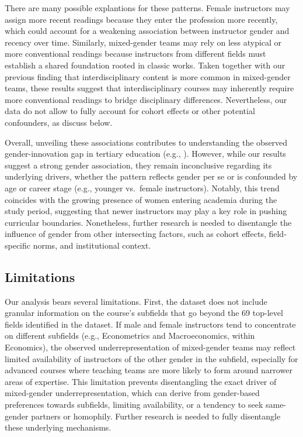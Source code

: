 \documentclass[
  british,
  11pt,
]{article}
\begin{document}
There are many possible explantions for these patterns. Female instructors may assign more recent readings because they enter the profession more recently, which could account for a weakening association between instructor gender and recency over time. Similarly, mixed-gender teams may rely on less atypical or more conventional readings because instructors from different fields must establish a shared foundation rooted in classic works. Taken together with our previous finding that interdisciplinary content is more common in mixed-gender teams, these results suggest that interdisciplinary courses may inherently require more conventional readings to bridge disciplinary differences. Nevertheless, our data do not allow to fully account for cohort effects or other potential confounders, as discuss below.

Overall, unveiling these associations contributes to understanding the observed gender-innovation gap in tertiary education (e.g., ). However, while our results suggest a strong gender association, they remain inconclusive regarding its underlying drivers, whether the pattern reflects gender per se or is confounded by age or career stage (e.g., younger vs.~female instructors). Notably, this trend coincides with the growing presence of women entering academia during the study period, suggesting that newer instructors may play a key role in pushing curricular boundaries. Nonetheless, further research is needed to disentangle the influence of gender from other intersecting factors, such as cohort effects, field-specific norms, and institutional context.

\subsection{Limitations}\label{limitations}

Our analysis bears several limitations. First, the dataset does not include granular information on the course's subfields that go beyond the 69 top-level fields identified in the dataset. If male and female instructors tend to concentrate on different subfields (e.g., Econometrics and Macroeconomics, within Economics), the observed underrepresentation of mixed-gender teams may reflect limited availability of instructors of the other gender in the subfield, especially for advanced courses where teaching teams are more likely to form around narrower areas of expertise. This limitation prevents disentangling the exact driver of mixed-gender underrepresentation, which can derive from gender-based preferences towards subfields, limiting availability, or a tendency to seek same-gender partners or homophily. Further research is needed to fully disentangle these underlying mechanisms.
\end{document}
